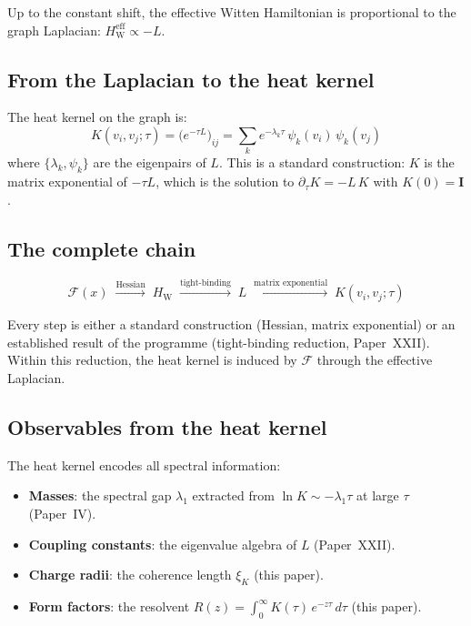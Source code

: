 \documentclass[12pt]{article}
\newcommand{\Fcal}{\mathcal{F}}
\newcommand{\HW}{H_{\mathrm{W}}}
\begin{document}
Up to the constant shift, the effective Witten Hamiltonian is proportional to the graph Laplacian: $\HW^{\mathrm{eff}} \propto -L$.

\subsection{From the Laplacian to the heat kernel}

The heat kernel on the graph is:
\begin{equation}\label{eq:heatkernel}
    K(v_i, v_j; \tau) = \bigl(e^{-\tau L}\bigr)_{ij} = \sum_k e^{-\lambda_k \tau}\, \psi_k(v_i)\,\psi_k(v_j)
\end{equation}
where $\{\lambda_k, \psi_k\}$ are the eigenpairs of $L$. This is a standard construction: $K$ is the matrix exponential of $-\tau L$, which is the solution to $\partial_\tau K = -L\,K$ with $K(0) = \mathbf{I}$.

\subsection{The complete chain}

\begin{equation}
    \Fcal(x) \;\xrightarrow{\text{Hessian}}\; \HW \;\xrightarrow{\text{tight-binding}}\; L \;\xrightarrow{\text{matrix exponential}}\; K(v_i, v_j; \tau)
\end{equation}

Every step is either a standard construction (Hessian, matrix exponential) or an established result of the programme (tight-binding reduction, Paper~XXII). Within this reduction, the heat kernel is induced by $\Fcal$ through the effective Laplacian.

\subsection{Observables from the heat kernel}

The heat kernel encodes all spectral information:
\begin{itemize}
    \item \textbf{Masses}: the spectral gap $\lambda_1$ extracted from $\ln K \sim -\lambda_1 \tau$ at large $\tau$ (Paper~IV).
    \item \textbf{Coupling constants}: the eigenvalue algebra of $L$ (Paper~XXII).
    \item \textbf{Charge radii}: the coherence length $\xi_K$ (this paper).
    \item \textbf{Form factors}: the resolvent $R(z) = \int_0^\infty K(\tau)\,e^{-z\tau}\,d\tau$ (this paper).
\end{itemize}
\end{document}
